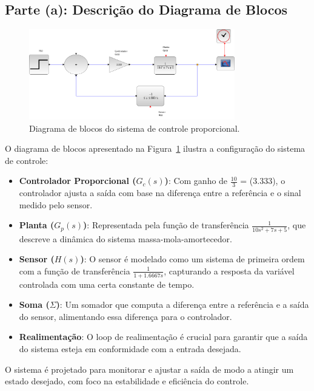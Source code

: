 \subsection{Parte (a): Descrição do Diagrama de Blocos}

\begin{figure}[H]
    \centering
    \includegraphics[width=0.8\textwidth]{atividades/4-atividade/assets/diagrama-blocos.png}
    \caption{Diagrama de blocos do sistema de controle proporcional.}
    \label{fig:diagrama_blocos}
\end{figure}

O diagrama de blocos apresentado na Figura~\ref{fig:diagrama_blocos} ilustra a configuração do sistema de controle:

\begin{itemize}
    \item \textbf{Controlador Proporcional (\(G_c(s)\))}: Com ganho de \(\frac{10}{3}\) = (\(3.333\)), o controlador ajusta a saída com base na diferença entre a referência e o sinal medido pelo sensor.
    \item \textbf{Planta (\(G_p(s)\))}: Representada pela função de transferência \(\frac{1}{10s^2 + 7s + 5}\), que descreve a dinâmica do sistema massa-mola-amortecedor.
    \item \textbf{Sensor (\(H(s)\))}: O sensor é modelado como um sistema de primeira ordem com a função de transferência \(\frac{1}{1 + 1.6667s}\), capturando a resposta da variável controlada com uma certa constante de tempo.
    \item \textbf{Soma (\(\Sigma\))}: Um somador que computa a diferença entre a referência e a saída do sensor, alimentando essa diferença para o controlador.
    \item \textbf{Realimentação}: O loop de realimentação é crucial para garantir que a saída do sistema esteja em conformidade com a entrada desejada.
\end{itemize}

O sistema é projetado para monitorar e ajustar a saída de modo a atingir um estado desejado, com foco na estabilidade e eficiência do controle.


